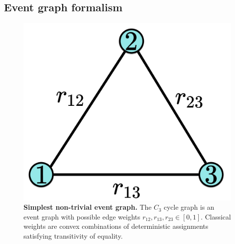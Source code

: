 \documentclass[a4paper,twocolumn,11pt,accepted=2024-01-17]{quantumarticle}
\begin{document}
\subsection{Event graph formalism}\label{subsec: event graphs}
\begin{figure}[bt]
    \centering
    \includegraphics[width=0.2 \textwidth]{Acc_Figures/SimplestEventGraph.png}
    \caption{\textbf{Simplest non-trivial event graph.} The $C_3$ cycle graph is an event graph with possible edge weights $r_{12},r_{13},r_{23} \in [0,1]$. Classical weights are convex combinations of deterministic assignments satisfying transitivity of equality.}
    \label{fig: simplest event graph}
 \end{figure}
\end{document}
